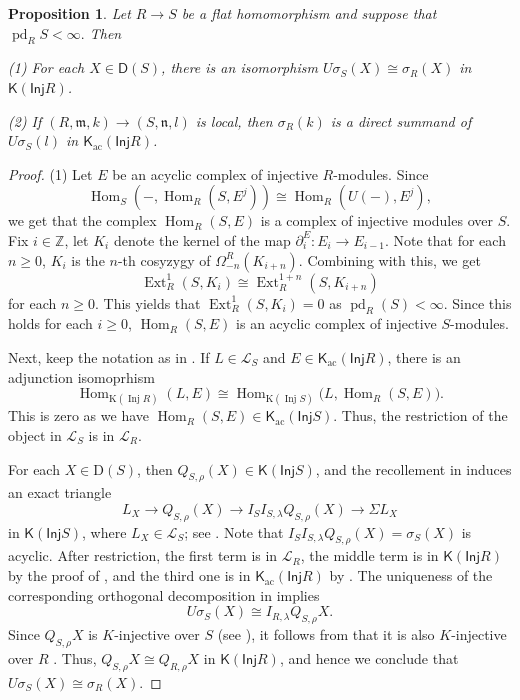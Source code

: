 \documentclass{amsart}
\newcommand{\Z}{\mathbb{Z}}
\newcommand{\D}{\mathsf{D}}
\newcommand{\K}{\mathsf{K}}
\newcommand{\del}{\partial}
\newcommand{\0}{{\bf{0}}}
\DeclareMathOperator{\pd}{pd}
\DeclareMathOperator{\ac}{ac}
\DeclareMathOperator{\Hom}{Hom}
\DeclareMathOperator{\Ext}{Ext}
\newcommand{\Inj}{\mathsf{Inj}}
\newtheorem{proposition}[theorem]{Proposition}
\theoremstyle{definition}
\begin{document}
\begin{proposition}\label{res-f}
Let \(R\to S\) be a flat homomorphism and suppose that
$\operatorname{pd}_R S<\infty. 
$
Then

(1) For each $X\in\D(S)$,  
there is an isomorphism
$
U\sigma_S(X)\cong\sigma_R(X)
$
in $\K(\Inj R)$. 

(2)
If
$
(R,\mathfrak m,k)\longrightarrow(S,\mathfrak n,l)
$
is local, then 
$
\sigma_R(k)
$
is a direct summand of $U\sigma_S(l)$ 
in \(\K_{\ac}(\Inj R)\).
\end{proposition}
\begin{proof}
(1) Let \(E\) be an acyclic complex of injective \(R\)-modules. Since \[
\operatorname{Hom}_S(-,\operatorname{Hom}_R(S,E^j))
\cong
\operatorname{Hom}_R(U(-),E^j),
\]
we get that the complex
$
\operatorname{Hom}_R(S,E)
$
is a complex of injective modules over \(S\).
Fix $i\in\Z$, let $K_i$ denote the kernel of the map $\del_i^E\colon E_i\to E_{i-1}$. Note that for each $n\geq 0$,  $K_i$ is the $n$-th cosyzygy of  $\Omega_{-{n}}^R(K_{i+n})$. Combining with this, we get
$$
\Ext^1_R(S,K_i)\cong \Ext^{1+n}_R(S,K_{i+n})
$$
for each $n\geq 0$.  This yields that $\Ext^1_R(S,K_i)=0$ as $\pd_R(S)<\infty$. 
Since this holds for each $i\geq 0$, \(\operatorname{Hom}_R(S,E)\) is an acyclic complex of injective \(S\)-modules.

 Next, keep the notation as in . If \(L\in\mathcal L_S\) and
\(E\in\K_{\ac}(\Inj R)\), there is an adjunction isomoprhism
\[
\operatorname{Hom}_{\mathrm K(\operatorname{Inj}R)}(L,E)
\cong
\operatorname{Hom}_{\mathrm K(\operatorname{Inj}S)}
\bigl(L,\operatorname{Hom}_R(S,E)\bigr).
\]
This is zero as we have $\Hom_R(S,E)\in \K_{\ac}(\Inj S)$. 
Thus, the restriction of the object in $
\mathcal L_S$ is in  $\mathcal L_R.$

For each \(X\in\mathrm D(S)\), then $Q_{S,\rho}(X)\in \K(\Inj S)$,  and the recollement in  induces an exact triangle
\[
L_X\longrightarrow Q_{S,\rho}(X)
\longrightarrow I_S I_{S,\lambda} Q_{S,\rho}(X)
\longrightarrow\Sigma L_X
\]
in $\K(\Inj S)$,
where \(L_X\in\mathcal L_S\); see . Note that $I_S I_{S,\lambda} Q_{S,\rho}(X)=\sigma_S(X)$ is acyclic. After restriction, the first term is in \(\mathcal L_R\), the middle term is in $\K(\Inj R)$ by the proof of , and the third one is in $\K_{\ac}(\Inj R)$ by . The uniqueness of the corresponding orthogonal decomposition in  implies
\[
U\sigma_S(X)\cong I_{R,\lambda}Q_{S,\rho}X.
\]
Since $Q_{S,\rho}X$ is $K$-injective over $S$ (see ), it follows from  that it is also $K$-injective over $R$ . Thus, $Q_{S,\rho}X\cong Q_{R,\rho}X$  in $\K(\Inj R)$, and hence we conclude that $U\sigma_S(X)\cong \sigma_R(X)$.


\end{proof}
\end{document}
